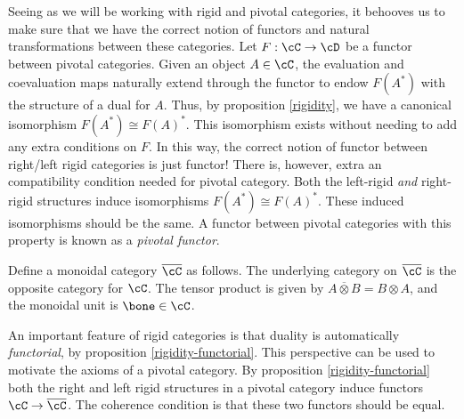 \begin{rem} Seeing as we will be working with rigid and pivotal categories, it behooves us to make sure that we have the correct notion of functors and natural transformations between these categories. Let $F:\cC\to \cD$ be a functor between pivotal categories. Given an object $A\in \cC$, the evaluation and coevaluation maps naturally extend through the functor to endow $F(A^*)$ with the structure of a dual for $A$. Thus, by proposition \ref{rigidity}, we have a canonical isomorphism $F(A^*)\cong F(A)^*$. This isomorphism exists without needing to add any extra conditions on $F$. In this way, the correct notion of functor between right/left rigid categories is just functor! There is, however, extra an compatibility condition needed for pivotal category. Both the left-rigid {\em and} right-rigid structures induce isomorphisms $F(A^*)\cong F(A)^*$. These induced isomorphisms should be the same. A functor between pivotal categories with this property is known as a {\em pivotal functor}.
\end{rem}

\begin{defn} Define a monoidal category $\overline{\cC}$ as follows. The underlying category on $\overline{\cC}$ is the opposite category for $\cC$. The tensor product is given by $A\overline{\otimes} B = B\otimes A$, and the monoidal unit is $\bone \in \cC$. 
\end{defn}

\begin{rem} An important feature of rigid categories is that duality is automatically {\em functorial}, by proposition \ref{rigidity-functorial}. This perspective can be used to motivate the axioms of a pivotal category. By proposition \ref{rigidity-functorial} both the right and left rigid structures in a pivotal category induce functors $\cC\to \overline{\cC}$. The coherence condition is that these two functors should be equal.
\end{rem}

